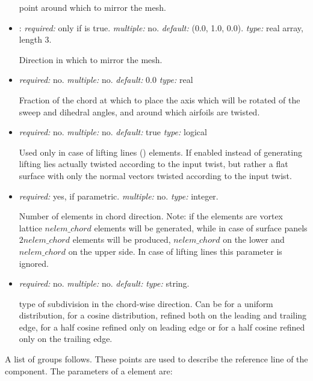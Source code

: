 \begin{itemize}
point around which to mirror the mesh.

\item {}: \textit{required:} only if  is true. \textit{multiple:} no. \textit{default:} (0.0, 1.0, 0.0). \textit{type:} real array, length 3.

Direction in which to mirror the mesh.

\item {} \textit{required:} no. \textit{multiple:} no. \textit{default:} 0.0 \textit{type:} real

Fraction of the chord at which to place the axis which will be rotated of the sweep and dihedral angles, and around which airfoils are twisted. 

\item {} \textit{required:} no. \textit{multiple:} no. \textit{default:} true \textit{type:} logical

Used only in case of lifting lines () elements. If enabled instead of generating lifting lies actually twisted according to the input twist, but rather a flat surface with only the normal vectors twisted according to the input twist. 

\item {} \textit{required:} yes, if parametric. \textit{multiple:} no. \textit{type:} integer.

Number of elements in chord direction. Note: if the elements are vortex lattice $nelem\_chord$ elements will be generated, while in case of surface panels $2nelem\_chord$ elements will be produced, $nelem\_chord$ on the lower and $nelem\_chord$ on the upper side. In case of lifting lines this parameter is ignored.

\item {} \textit{required:} no. \textit{multiple:} no. \textit{default:}  \textit{type:} string.

type of subdivision in the chord-wise direction. Can be  for a uniform distribution,  for a cosine distribution, refined both on the leading and trailing edge,  for a half cosine refined only on leading edge or  for a half cosine refined only on the trailing edge. 

\end{itemize}
%
A list of  groups follows. These points are used to describe the reference line of the component. The parameters of a  element are:
